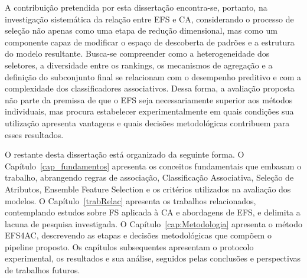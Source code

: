 A contribuição pretendida por esta dissertação encontra-se, portanto, na investigação sistemática da relação entre EFS e CA, considerando o processo de seleção não apenas como uma etapa de redução dimensional, mas como um componente capaz de modificar o espaço de descoberta de padrões e a estrutura do modelo resultante. Busca-se compreender como a heterogeneidade dos seletores, a diversidade entre os rankings, os mecanismos de agregação e a definição do subconjunto final se relacionam com o desempenho preditivo e com a complexidade dos classificadores associativos. Dessa forma, a avaliação proposta não parte da premissa de que o EFS seja necessariamente superior aos métodos individuais, mas procura estabelecer experimentalmente em quais condições sua utilização apresenta vantagens e quais decisões metodológicas contribuem para esses resultados.

O restante desta dissertação está organizado da seguinte forma. O Capítulo~\ref{cap_fundamentos} apresenta os conceitos fundamentais que embasam o trabalho, abrangendo regras de associação, Classificação Associativa, Seleção de Atributos, Ensemble Feature Selection e os critérios utilizados na avaliação dos modelos. O Capítulo~\ref{trabRelac} apresenta os trabalhos relacionados, contemplando estudos sobre FS aplicada à CA e abordagens de EFS, e delimita a lacuna de pesquisa investigada. O Capítulo~\ref{cap:Metodologia} apresenta o método EFS4AC, descrevendo as etapas e decisões metodológicas que compõem o pipeline proposto. Os capítulos subsequentes apresentam o protocolo experimental, os resultados e sua análise, seguidos pelas conclusões e perspectivas de trabalhos futuros.
